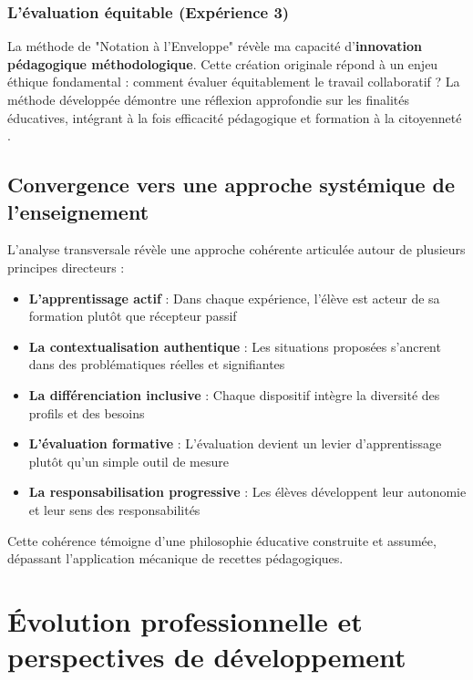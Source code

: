\subsubsection{L'évaluation équitable (Expérience 3)}

La méthode de "Notation à l'Enveloppe" révèle ma capacité d'\textbf{innovation pédagogique méthodologique}. Cette création originale répond à un enjeu éthique fondamental : comment évaluer équitablement le travail collaboratif ? La méthode développée démontre une réflexion approfondie sur les finalités éducatives, intégrant à la fois efficacité pédagogique et formation à la citoyenneté \parencite{evaluation_pairs_utc,evaluation_formative}.

\subsection{Convergence vers une approche systémique de l'enseignement}

L'analyse transversale révèle une approche cohérente articulée autour de plusieurs principes directeurs :

\begin{itemize}[leftmargin=*]
    \item \textbf{L'apprentissage actif} : Dans chaque expérience, l'élève est acteur de sa formation plutôt que récepteur passif
    \item \textbf{La contextualisation authentique} : Les situations proposées s'ancrent dans des problématiques réelles et signifiantes
    \item \textbf{La différenciation inclusive} : Chaque dispositif intègre la diversité des profils et des besoins
    \item \textbf{L'évaluation formative} : L'évaluation devient un levier d'apprentissage plutôt qu'un simple outil de mesure
    \item \textbf{La responsabilisation progressive} : Les élèves développent leur autonomie et leur sens des responsabilités
\end{itemize}

Cette cohérence témoigne d'une philosophie éducative construite et assumée, dépassant l'application mécanique de recettes pédagogiques.

\section{Évolution professionnelle et perspectives de développement}


